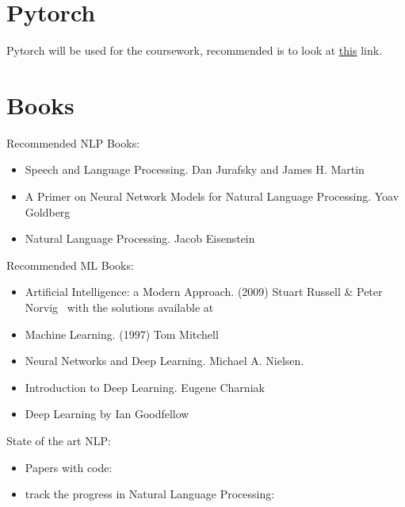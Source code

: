 \documentclass[11pt]{article}
\begin{document}


\tableofcontents

\clearpage

\section{Pytorch}

Pytorch will be used for the coursework, recommended is to look at \href{https://pytorch.org/tutorials/beginner/deep_learning_60min_blitz.html}{this} link.

\section{Books}

Recommended NLP Books:

\begin{itemize}
    \item Speech and Language Processing. Dan Jurafsky and James H. Martin~\cite{book-speech-and-language-processing}
    \item A Primer on Neural Network Models for Natural Language Processing.
          Yoav Goldberg~\cite{primer-on-nlp}
    \item Natural Language Processing. Jacob Eisenstein~\cite{git-natural-language-processing}
\end{itemize}

Recommended ML Books:

\begin{itemize}
    \item Artificial Intelligence: a Modern Approach. (2009) Stuart Russell \& Peter Norvig~\cite{AI-modern-approach} with the solutions available at~\cite{AI-modern-approach-slutions}
    \item Machine Learning. (1997) Tom Mitchell~\cite{tom-mitchell-book}
    \item Neural Networks and Deep Learning. Michael A. Nielsen.
    \item Introduction to Deep Learning. Eugene Charniak~\cite{intro-to-dl-eugene-charniak}
    \item Deep Learning by Ian Goodfellow~\cite{Goodfellow-et-al-2016}
\end{itemize}

State of the art NLP:

\begin{itemize}
    \item Papers with code:~\cite{papers-with-code}
    \item  track the progress in Natural Language Processing:~\cite{track-progress-nlp}
\end{itemize}
\end{document}
